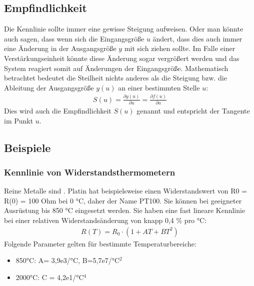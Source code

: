 \documentclass[letterpaper,10pt,english]{jupyterBook}
\begin{document}
\subsection{Empfindlichkeit}
\label{\detokenize{content/2_idealeKennlinie:empfindlichkeit}}
\sphinxAtStartPar
Die Kennlinie sollte immer eine gewisse Steigung aufweisen. Oder man könnte auch sagen, dass wenn sich die Eingangsgröße \(u\) ändert, dass dies auch immer eine Änderung in der Ausgangsgröße \(y\) mit sich ziehen sollte. Im Falle einer Verstärkungseinheit könnte diese Änderung sogar vergrößert werden und das System reagiert somit  auf Änderungen der Eingangsgröße. Mathematisch betrachtet bedeutet die Steilheit nichts anderes als die Steigung bzw. die Ableitung der Ausgangsgröße \(y(u)\) an einer bestimmten Stelle \(u\):
\begin{equation*}
\begin{split}S(u) = \frac{\partial y(u)}{\partial u} = \frac{\partial f(u)}{\partial u}\end{split}
\end{equation*}
\sphinxAtStartPar
Dies wird auch die Empfindlichkeit \(S(u)\) genannt und entspricht der Tangente im Punkt \(u\).


\subsection{Beispiele}
\label{\detokenize{content/2_idealeKennlinie:beispiele}}
\sphinxAtStartPar



\subsubsection{Kennlinie von Widerstandsthermometern}
\label{\detokenize{content/2_idealeKennlinie:kennlinie-von-widerstandsthermometern}}
\sphinxAtStartPar
Reine Metalle sind . Platin hat beispielsweise einen Widerstandswert von R0 = R(0) = 100 Ohm bei 0 °C, daher der Name PT100. Sie können bei geeigneter Ausrüstung bis 850 °C eingesetzt werden. Sie haben eine fast lineare Kennlinie bei einer relativen Widerstandsänderung von knapp 0,4 \% pro °C:
\begin{equation*}
\begin{split}R(T) = R_0 \cdot (1 + AT + BT^2)\end{split}
\end{equation*}
\sphinxAtStartPar
Folgende Parameter gelten für bestimmte Temperaturbereiche:
\begin{itemize}
\item {} 
\sphinxhyphen{}850°C: A= 3,9e\sphinxhyphen{}3/°C, B=\sphinxhyphen{}5,7e\sphinxhyphen{}7/°C\(^2\)

\item {} 
\sphinxAtStartPar
\sphinxhyphen{}200\sphinxhyphen{}0°C: C = \sphinxhyphen{}4,2e\sphinxhyphen{}1/°C\(^4\)

\end{itemize}
\end{document}
